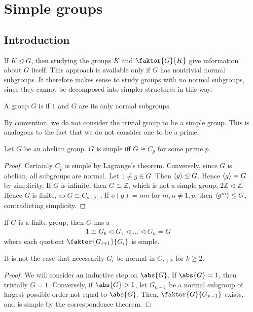 \section{Simple groups}

\subsection{Introduction}
If $K \trianglelefteq G$, then studying the groups $K$ and $\faktor{G}{K}$ give information about $G$ itself.
This approach is available only if $G$ has nontrivial normal subgroups.
It therefore makes sense to study groups with no normal subgroups, since they cannot be decomposed into simpler structures in this way.

\begin{definition}
	A group $G$ is  if $\qty{1}$ and $G$ are its only normal subgroups.
\end{definition}

By convention, we do not consider the trivial group to be a simple group.
This is analogous to the fact that we do not consider one to be a prime.

\begin{lemma} \label{lem:1.3}
	Let $G$ be an abelian group.
	$G$ is simple iff $G \cong C_p$ for some prime $p$.
\end{lemma}

\begin{proof}
	Certainly $C_p$ is simple by Lagrange's theorem.
	Conversely, since $G$ is abelian, all subgroups are normal.
	Let $1 \neq g \in G$.
	Then $\left\langle{} g \right\rangle \trianglelefteq G$.
	Hence $\left\langle{} g \right\rangle = G$ by simplicity.
	If $G$ is infinite, then $G \cong \mathbb Z$, which is not a simple group; $2\mathbb Z \triangleleft \mathbb Z$.
	Hence $G$ is finite, so $G \cong C_{o(g)}$.
	If $o(g) = mn$ for $m, n \neq 1, p$, then $\left\langle{} g^m \right\rangle \leq G$, contradicting simplicity.
\end{proof}

\begin{lemma} \label{lem:1.4}
	If $G$ is a finite group, then $G$ has a 
	\begin{align*}
		1 \cong G_0 \triangleleft G_1 \triangleleft \dots \triangleleft G_n = G
	\end{align*}
	where each quotient $\faktor{G_{i+1}}{G_i}$ is simple.
\end{lemma}

\begin{remark}
	It is not the case that necessarily $G_i$ be normal in $G_{i+k}$ for $k \geq 2$.
\end{remark}

\begin{proof}
	We will consider an inductive step on $\abs{G}$.
	If $\abs{G} = 1$, then trivially $G = 1$.
	Conversely, if $\abs{G} > 1$, let $G_{n-1}$ be a normal subgroup of largest possible order not equal to $\abs{G}$.
	Then, $\faktor{G}{G_{n-1}}$ exists, and is simple by the correspondence theorem.
\end{proof}
